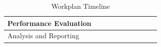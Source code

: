 \begin{table}[!htbp]
\begin{tabular}{l|lllllllll|}
        \multicolumn{1}{|l|}{Performance Evaluation}                        & \multicolumn{1}{l|}{}                             & \multicolumn{1}{l|}{}                         & \multicolumn{1}{l|}{}                       & \multicolumn{1}{l|}{}                       & \multicolumn{1}{l|}{\cellcolor{blue!25}{}}  & \multicolumn{1}{l|}{\cellcolor{blue!25}{}}  & \multicolumn{1}{l|}{\cellcolor{blue!25}{}}    & \multicolumn{1}{l|}{\cellcolor{blue!25}{}}  & \multicolumn{1}{l|}{\cellcolor{blue!25}{}}  \\ \hline
        \multicolumn{1}{|l|}{Analysis and Reporting}                        & \multicolumn{1}{l|}{}                             & \multicolumn{1}{l|}{}                         & \multicolumn{1}{l|}{}                       & \multicolumn{1}{l|}{}                       & \multicolumn{1}{l|}{}                       & \multicolumn{1}{l|}{}                       & \multicolumn{1}{l|}{\cellcolor{blue!25}{}}    & \multicolumn{1}{l|}{\cellcolor{blue!25}{}}  & \multicolumn{1}{l|}{\cellcolor{blue!25}{}}  \\ \hline
    \end{tabular}
    \caption{Workplan Timeline}
    \label{tab:workplan}
\end{table}
